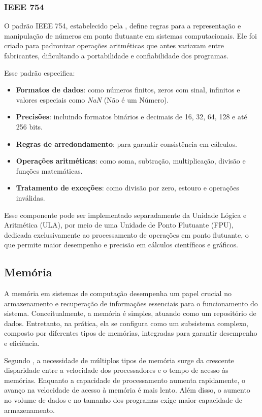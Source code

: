 \documentclass[
	12pt,				%
	openright,			%
	oneside,			%
	a4paper,			%
	english,			%
	french,				%
	spanish,			%
	brazil,				%
	]{abntex2}
\begin{document}
\subsubsection{IEEE 754}
O padrão IEEE 754, estabelecido pela , define regras para a representação e manipulação de números em ponto flutuante em sistemas computacionais. Ele foi criado para padronizar operações aritméticas que antes variavam entre fabricantes, dificultando a portabilidade e confiabilidade dos programas.

Esse padrão especifica:
\begin{itemize}
    \item \textbf{Formatos de dados}: como números finitos, zeros com sinal, infinitos e valores especiais como \textit{NaN} (Não é um Número).
    \item \textbf{Precisões}: incluindo formatos binários e decimais de 16, 32, 64, 128 e até 256 bits.
    \item \textbf{Regras de arredondamento}: para garantir consistência em cálculos.
    \item \textbf{Operações aritméticas}: como soma, subtração, multiplicação, divisão e funções matemáticas.
    \item \textbf{Tratamento de exceções}: como divisão por zero, estouro e operações inválidas.
\end{itemize}

Esse componente pode ser implementado separadamente da Unidade Lógica e Aritmética (ULA), por meio de uma Unidade de Ponto Flutuante (FPU), dedicada exclusivamente ao processamento de operações em ponto flutuante, o que permite maior desempenho e precisão em cálculos científicos e gráficos.

\subsection{Memória}\label{sec:memoria}
A memória em sistemas de computação desempenha um papel crucial no armazenamento e recuperação de informações essenciais para o funcionamento do sistema. Conceitualmente, a memória é simples, atuando como um repositório de dados. Entretanto, na prática, ela se configura como um subsistema complexo, composto por diferentes tipos de memórias, integradas para garantir desempenho e eficiência.\cite[p.79]{monteiro_introducao_2007}

Segundo , a necessidade de múltiplos tipos de memória surge da crescente disparidade entre a velocidade dos processadores e o tempo de acesso às memórias. Enquanto a capacidade de processamento aumenta rapidamente, o avanço na velocidade de acesso à memória é mais lento. Além disso, o aumento no volume de dados e no tamanho dos programas exige maior capacidade de armazenamento.
\end{document}

